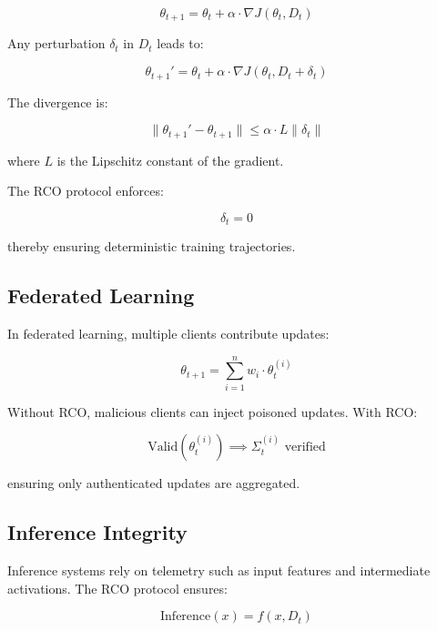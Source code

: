 \begin{equation}
\theta_{t+1} = \theta_t + \alpha \cdot \nabla J(\theta_t, D_t)
\end{equation}

Any perturbation $\delta_t$ in $D_t$ leads to:

\begin{equation}
\theta_{t+1}' = \theta_t + \alpha \cdot \nabla J(\theta_t, D_t + \delta_t)
\end{equation}

The divergence is:

\begin{equation}
\|\theta_{t+1}' - \theta_{t+1}\| \leq \alpha \cdot L \|\delta_t\|
\end{equation}

where $L$ is the Lipschitz constant of the gradient.

The RCO protocol enforces:

\begin{equation}
\delta_t = 0
\end{equation}

thereby ensuring deterministic training trajectories.

\subsection{Federated Learning}

In federated learning, multiple clients contribute updates:

\begin{equation}
\theta_{t+1} = \sum_{i=1}^{n} w_i \cdot \theta_t^{(i)}
\end{equation}

Without RCO, malicious clients can inject poisoned updates. With RCO:

\begin{equation}
\text{Valid}(\theta_t^{(i)}) \implies \Sigma_t^{(i)} \text{ verified}
\end{equation}

ensuring only authenticated updates are aggregated.

\subsection{Inference Integrity}

Inference systems rely on telemetry such as input features and intermediate activations. The RCO protocol ensures:

\begin{equation}
\text{Inference}(x) = f(x, D_t)
\end{equation}

